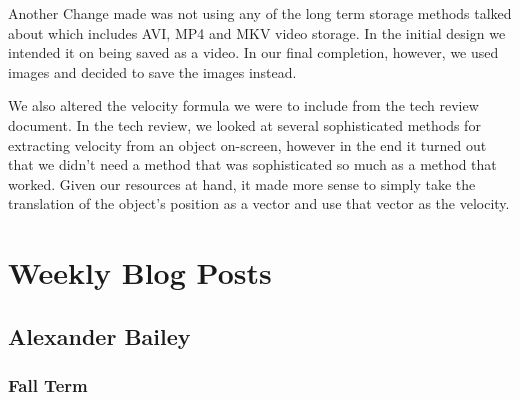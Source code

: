 \documentclass[onecolumn, draftclsnofoot,10pt, compsoc]{IEEEtran}
\begin{document}
Another Change made was not using any of the long term storage methods talked about which includes AVI, MP4 and MKV video storage. In the initial design we intended it on being saved as a video. In our final completion, however, we used images and decided to save the images instead.

We also altered the velocity formula we were to include from the tech review document.  In the tech review, we looked at several sophisticated methods for extracting velocity from an object on-screen, however in the end it turned out that we didn't need a method that was sophisticated so much as a method that worked.  Given our resources at hand, it made more sense to simply take the translation of the object's position as a vector and use that vector as the velocity.



\section{Weekly Blog Posts}
\subsection{Alexander Bailey}
\subsubsection{Fall Term}
\end{document}
